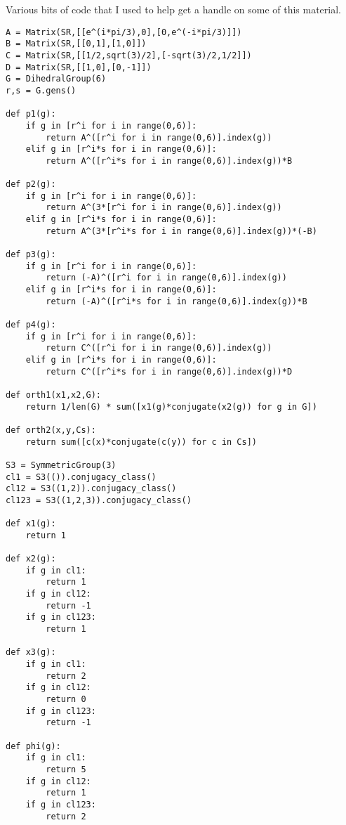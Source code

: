 \documentclass[10pt]{article}
\theoremstyle{plain}
\theoremstyle{remark}
\begin{document}
Various bits of code that I used to help get a
handle on some of this material.
\begin{verbatim}
A = Matrix(SR,[[e^(i*pi/3),0],[0,e^(-i*pi/3)]])
B = Matrix(SR,[[0,1],[1,0]])
C = Matrix(SR,[[1/2,sqrt(3)/2],[-sqrt(3)/2,1/2]])
D = Matrix(SR,[[1,0],[0,-1]])
G = DihedralGroup(6)
r,s = G.gens()

def p1(g):
    if g in [r^i for i in range(0,6)]:
        return A^([r^i for i in range(0,6)].index(g))
    elif g in [r^i*s for i in range(0,6)]:
        return A^([r^i*s for i in range(0,6)].index(g))*B

def p2(g):
    if g in [r^i for i in range(0,6)]:
        return A^(3*[r^i for i in range(0,6)].index(g))
    elif g in [r^i*s for i in range(0,6)]:
        return A^(3*[r^i*s for i in range(0,6)].index(g))*(-B)

def p3(g):
    if g in [r^i for i in range(0,6)]:
        return (-A)^([r^i for i in range(0,6)].index(g))
    elif g in [r^i*s for i in range(0,6)]:
        return (-A)^([r^i*s for i in range(0,6)].index(g))*B

def p4(g):
    if g in [r^i for i in range(0,6)]:
        return C^([r^i for i in range(0,6)].index(g))
    elif g in [r^i*s for i in range(0,6)]:
        return C^([r^i*s for i in range(0,6)].index(g))*D

def orth1(x1,x2,G):
    return 1/len(G) * sum([x1(g)*conjugate(x2(g)) for g in G])

def orth2(x,y,Cs):
    return sum([c(x)*conjugate(c(y)) for c in Cs])

S3 = SymmetricGroup(3)
cl1 = S3(()).conjugacy_class()
cl12 = S3((1,2)).conjugacy_class()
cl123 = S3((1,2,3)).conjugacy_class()

def x1(g):
    return 1

def x2(g):
    if g in cl1:
        return 1
    if g in cl12:
        return -1
    if g in cl123:
        return 1

def x3(g):
    if g in cl1:
        return 2
    if g in cl12:
        return 0
    if g in cl123:
        return -1

def phi(g):
    if g in cl1:
        return 5
    if g in cl12:
        return 1
    if g in cl123:
        return 2
\end{verbatim}
\end{document}
